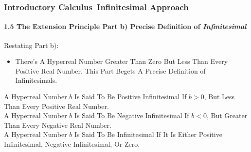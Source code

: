 \begin{frame}
\frametitle{Introductory Calculus--Infinitesimal Approach}
\framesubtitle{1.5 The Extension Principle Part b) Precise Definition of \alert{\textit{Infinitesimal}}}
\label{slide:1.5-07}
Restating Part b):
\begin{itemize}
\item \alert{There's A Hyperreal Number Greater Than Zero But Less Than Every Positive Real Number}. This Part Begets A Precise Definition of Infinitesimals.
\end{itemize}
\begin{definition}[Infinitesimal]
A Hyperreal Number $b$ Is Said To Be \alert{Positive Infinitesimal} If $b>0$, But Less Than Every Positive Real Number. \\
A Hyperreal Number $b$ Is Said To Be \alert{Negative Infinitesimal} If $b<0$, But Greater Than Every Negative Real Number. \\
A Hyperreal Number $b$ Is Said To Be \alert{Infinitesimal} If It Is \alert{Either Positive Infinitesimal, Negative Infinitesimal, Or Zero}.
\label{def:infinitesimal}
\end{definition}
\end{frame}
